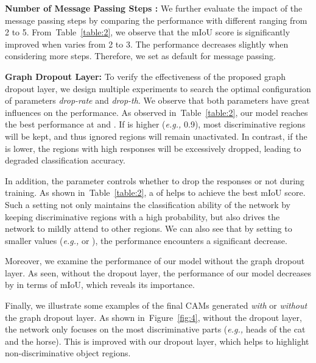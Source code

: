 \documentclass[letterpaper]{article} \usepackage{aaai21}  \usepackage{times}  \usepackage{helvet} \usepackage{courier}  \usepackage[hyphens]{url}  \usepackage{graphicx} \urlstyle{rm} \def\UrlFont{\rm}  \usepackage{graphicx}  \usepackage{natbib}  \usepackage{caption} \frenchspacing  \setlength{\pdfpagewidth}{8.5in}  \setlength{\pdfpageheight}{11in}
\newcommand{\tabref}[1]{Table~\ref{#1}}
\newcommand{\figref}[1]{Figure~\ref{#1}}
\newcommand{\eg}[1]{\textit{e.g.,}}
\begin{document}
\noindent\textbf{Number of Message Passing Steps :}
We further evaluate the impact of the message passing steps by comparing the performance with different  ranging from 2 to 5. From~\tabref{table:2}, we observe that the mIoU score is significantly improved when  varies from 2 to 3. The performance decreases slightly when considering more steps. Therefore, we set  as default for message passing.






\noindent\textbf{Graph Dropout Layer:}
To verify the effectiveness of the proposed graph dropout layer, we design multiple experiments to search the optimal configuration of parameters \textit{drop-rate} and \textit{drop-th}. We observe that both parameters have great influences on the performance. As observed in~\tabref{table:2}, our model reaches the best performance at  and . If  is higher (\eg, 0.9), most discriminative regions will be kept, and thus ignored regions will remain unactivated. In contrast, if the  is lower, the regions with high responses  will be excessively dropped, leading to degraded classification accuracy. 

In addition, the parameter  controls whether to drop the responses or not during training. As shown in~\tabref{table:2}, a  of  helps to achieve the best mIoU score. Such a setting not only maintains the classification ability of the network by keeping discriminative regions with a high probability, but also drives the network to mildly attend to other regions. We can also see that by setting  to smaller values (\eg,  or ), the performance encounters a significant decrease.

Moreover, we examine the performance of our model without the graph dropout layer. As seen, without the dropout layer, the performance of our model decreases by  in terms of mIoU, which reveals its importance.


Finally, we illustrate some examples of the final CAMs generated \textit{with} or \textit{without} the graph dropout layer. As shown in~\figref{fig:4}, without the dropout layer, the network only focuses on the most discriminative parts (\eg, heads of the cat and the horse). This is improved with our dropout layer, which helps to highlight non-discriminative object regions.
\end{document}
